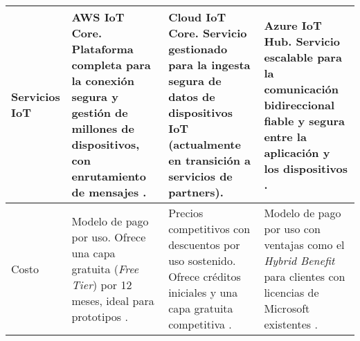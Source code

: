 \begin{longtable}{
    |p{2.5cm}   %
    |p{4.2cm}   %
    |p{4.2cm}   %
    |p{4.2cm}|  %
}
Servicios IoT 
    & \textbf{AWS IoT Core}. Plataforma completa para la conexión segura y gestión de millones de dispositivos, con enrutamiento de mensajes \cite{varonis2024}. 
    & \textbf{Cloud IoT Core}. Servicio gestionado para la ingesta segura de datos de dispositivos IoT (actualmente en transición a servicios de partners). 
    & \textbf{Azure IoT Hub}. Servicio escalable para la comunicación bidireccional fiable y segura entre la aplicación y los dispositivos \cite{varonis2024}. \\ \hline

Costo 
    & Modelo de pago por uso. Ofrece una capa gratuita (\textit{Free Tier}) por 12 meses, ideal para prototipos \cite{coursera2024}. 
    & Precios competitivos con descuentos por uso sostenido. Ofrece créditos iniciales y una capa gratuita competitiva \cite{datacamp2024}. 
    & Modelo de pago por uso con ventajas como el \textit{Hybrid Benefit} para clientes con licencias de Microsoft existentes \cite{varonis2024}. \\ \hline

\end{longtable}

